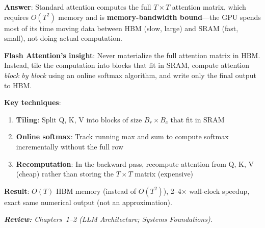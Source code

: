 \begin{questionbox}
\textbf{Answer}: Standard attention computes the full $T \times T$ attention matrix, which requires $O(T^2)$ memory and is \textbf{memory-bandwidth bound}---the GPU spends most of its time moving data between HBM (slow, large) and SRAM (fast, small), not doing actual computation.

\textbf{Flash Attention’s insight}: Never materialize the full attention matrix in HBM. Instead, tile the computation into blocks that fit in SRAM, compute attention \emph{block by block} using an online softmax algorithm, and write only the final output to HBM.

\textbf{Key techniques}:

\begin{enumerate}
  \item \textbf{Tiling}: Split Q, K, V into blocks of size $B_r \times B_c$ that fit in SRAM
  \item \textbf{Online softmax}: Track running max and sum to compute softmax incrementally without the full row
  \item \textbf{Recomputation}: In the backward pass, recompute attention from Q, K, V (cheap) rather than storing the $T \times T$ matrix (expensive)
\end{enumerate}

\textbf{Result}: $O(T)$ HBM memory (instead of $O(T^2)$), 2--4$\times$ wall-clock speedup, exact same numerical output (not an approximation).

\emph{\textbf{Review:} Chapters~1--2 (LLM Architecture; Systems Foundations).}
\end{questionbox}

